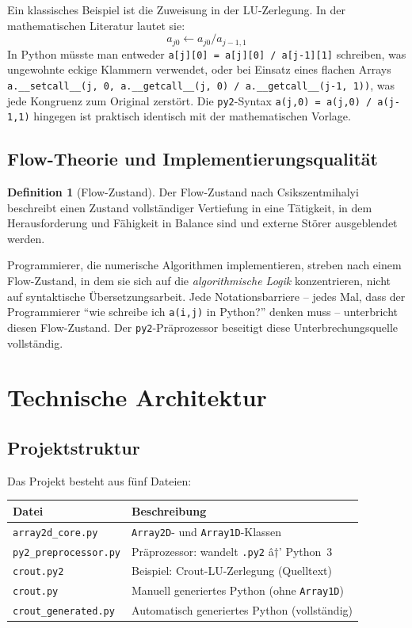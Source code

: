 ﻿\documentclass[a4paper,12pt]{article}
\theoremstyle{definition}
\newtheorem{definition}{Definition}
\begin{document}
Ein klassisches Beispiel ist die Zuweisung in der LU-Zerlegung. In der mathematischen
Literatur lautet sie:
\[
	a_{j0} \leftarrow a_{j0} / a_{j-1,1}
\]
In Python m\"usste man entweder \texttt{a[j][0] = a[j][0] / a[j-1][1]} schreiben,
was ungewohnte eckige Klammern verwendet, oder bei Einsatz eines flachen Arrays
\texttt{a.\_\_setcall\_\_(j, 0, a.\_\_getcall\_\_(j, 0) / a.\_\_getcall\_\_(j-1, 1))},
was jede Kongruenz zum Original zerst\"ort. Die \texttt{py2}-Syntax \texttt{a(j,0) = a(j,0) / a(j-1,1)}
hingegen ist praktisch identisch mit der mathematischen Vorlage.

\subsection{Flow-Theorie und Implementierungsqualit\"at}

\begin{definition}[Flow-Zustand]
	Der Flow-Zustand nach Csikszentmihalyi~\cite{csikszentmihalyi1990} beschreibt
	einen Zustand vollst\"andiger Vertiefung in eine T\"atigkeit, in dem Herausforderung
	und F\"ahigkeit in Balance sind und externe St\"orer ausgeblendet werden.
\end{definition}

Programmierer, die numerische Algorithmen implementieren, streben nach einem
Flow-Zustand, in dem sie sich auf die \emph{algorithmische Logik} konzentrieren,
nicht auf syntaktische \"Ubersetzungsarbeit. Jede Notationsbarriere -- jedes Mal,
dass der Programmierer ``wie schreibe ich \texttt{a(i,j)} in Python?'' denken muss --
unterbricht diesen Flow-Zustand. Der \texttt{py2}-Pr\"aprozessor beseitigt diese
Unterbrechungsquelle vollst\"andig.

\section{Technische Architektur}

\subsection{Projektstruktur}

Das Projekt besteht aus f\"unf Dateien:

\begin{center}
\begin{tabular}{ll}
\toprule
\textbf{Datei} & \textbf{Beschreibung} \\
\midrule
\texttt{array2d\_core.py} & \texttt{Array2D}- und \texttt{Array1D}-Klassen \\
\texttt{py2\_preprocessor.py} & Pr\"aprozessor: wandelt \texttt{.py2} â†’ Python~3 \\
\texttt{crout.py2} & Beispiel: Crout-LU-Zerlegung (Quelltext) \\
\texttt{crout.py} & Manuell generiertes Python (ohne \texttt{Array1D}) \\
\texttt{crout\_generated.py} & Automatisch generiertes Python (vollst\"andig) \\
\bottomrule
\end{tabular}
\end{center}
\end{document}
